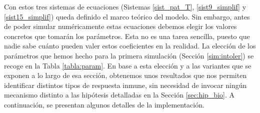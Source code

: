 Con estos tres sistemas de ecuaciones (Sistemas \ref{sist_pat_T}, \ref{sist9_simplif} y \ref{sist15_simplif}) queda definido el marco teórico del modelo. Sin embargo, antes de poder simular numéricamente estas ecuaciones debemos elegir los valores concretos que tomarán los parámetros. Esta no es una tarea sencilla, puesto que nadie sabe cuánto pueden valer estos coeficientes en la realidad. La elección de los parámetros que hemos hecho para la primera simulación (Sección \ref{sim:intoler}) se recoge en la Tabla \ref{tabla:param}. En base a esta elección y a las variantes que se exponen a lo largo de esa sección, obtenemos unos resultados que nos permiten identificar distintos tipos de respuesta inmune, sin necesidad de invocar ningún mecanismo distinto a las hipótesis detalladas en la Sección \ref{sec:hip_bio}. A continuación, se presentan algunos detalles de la implementación.

